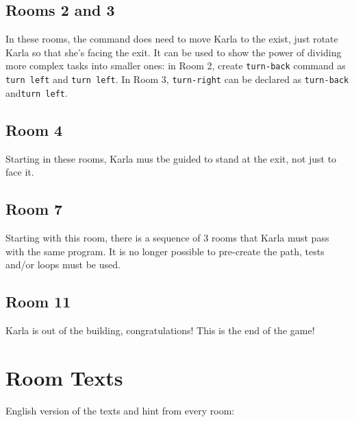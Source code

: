 \documentclass{article}
\begin{document}
\subsection{Rooms 2 and 3}

In these rooms, the command does need to move Karla to the exist, just rotate Karla
so that she's facing the exit. It can be used to show the power of dividing more complex
tasks into smaller ones: in Room 2, create \texttt{turn-back} command as \texttt{turn left} and
\texttt{turn left}. In Room 3, \texttt{turn-right} can be declared as \texttt{turn-back}
and\texttt{turn left}.

\subsection{Room 4}

Starting in these rooms, Karla mus tbe guided to stand at the exit, not just to face
it.

\subsection{Room 7}

Starting with this room, there is a sequence of 3 rooms that Karla must pass with
the same program. It is no longer possible to pre-create the path, tests and/or loops
must be used.

\subsection{Room 11}

Karla is out of the building, congratulations! This is the end of the game!

\section{Room Texts}

English version of the texts and hint from every room:


\end{document}
